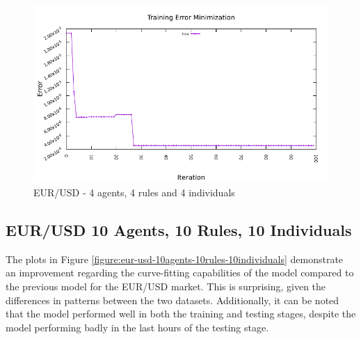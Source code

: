 \begin{figure}[htp]
  \medskip

  \includegraphics[width=.45\textwidth]{img/plots/eur_usd_h1-4agents-4rules-4ind-100gen_error_minimization.pdf}

  \caption{EUR/USD - 4 agents, 4 rules and 4 individuals}
  \label{figure:eur-usd-4agents-4rules-4individuals}
\end{figure}

\newpage

\subsection{EUR/USD 10 Agents, 10 Rules, 10 Individuals}
\label{results:forecast-eur-usd-10agents-10rules-10individuals}

The plots in Figure \ref{figure:eur-usd-10agents-10rules-10individuals}
demonstrate an improvement regarding the curve-fitting capabilities of the model
compared to the previous model for the EUR/USD market. This is surprising, given
the differences in patterns between the two datasets. Additionally, it can be
noted that the model performed well in both the training and testing stages,
despite the model performing badly in the last hours of the testing stage.

